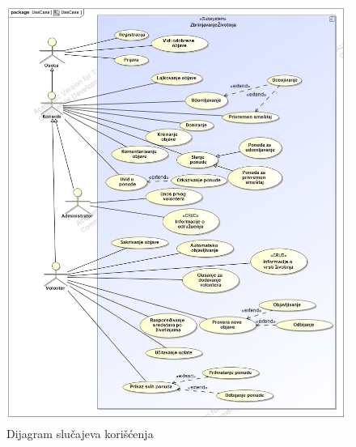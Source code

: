 \begin{figure}
    \centering
    \includegraphics[width=\textwidth]{img/use-case.jpg}
    \caption{Dijagram slučajeva korišćenja}
    \label{fig:use-case}
\end{figure}